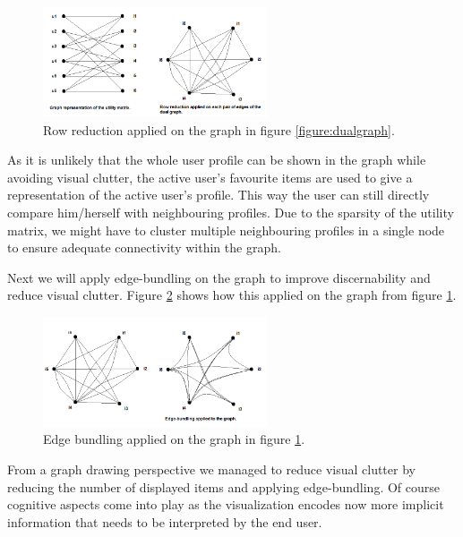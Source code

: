 \begin{figure}%
	\begin{center}
		\includegraphics[width=250px]{img/dualgraph_rowreduction}%
	\end{center}
	\caption{Row reduction applied on the graph in figure \ref{figure:dualgraph}.}%
	\label{figure:rowreduction_dualgraph}%
\end{figure}

As it is unlikely that the whole user profile can be shown in the graph while avoiding visual clutter, the active user's favourite items are used to give a representation of the active user's profile. This way the user can still directly compare him/herself with neighbouring profiles. Due to the sparsity of the utility matrix, we might have to cluster multiple neighbouring profiles in a single node to ensure adequate connectivity within the graph.

Next we will apply edge-bundling on the graph to improve discernability and reduce visual clutter\cite{Holten:2006:HEB:1187627.1187772, holten:2009}. Figure \ref{figure:edgebundling_dualgraph} shows how this applied on the graph from figure \ref{figure:rowreduction_dualgraph}.

\begin{figure}%
	\begin{center}
		\includegraphics[width=250px]{img/dualgraph_edgebundling}%
	\end{center}
	\caption{Edge bundling applied on the graph in figure \ref{figure:rowreduction_dualgraph}.}%
	\label{figure:edgebundling_dualgraph}%
\end{figure}

From a graph drawing perspective we managed to reduce visual clutter by reducing the number of displayed items and applying edge-bundling\cite{herman:2000, Holten:2006:HEB:1187627.1187772}.  Of course cognitive aspects come into play as the visualization encodes now more implicit information that needs to be interpreted by the end user\cite{herman:2000, ware:2004}.

